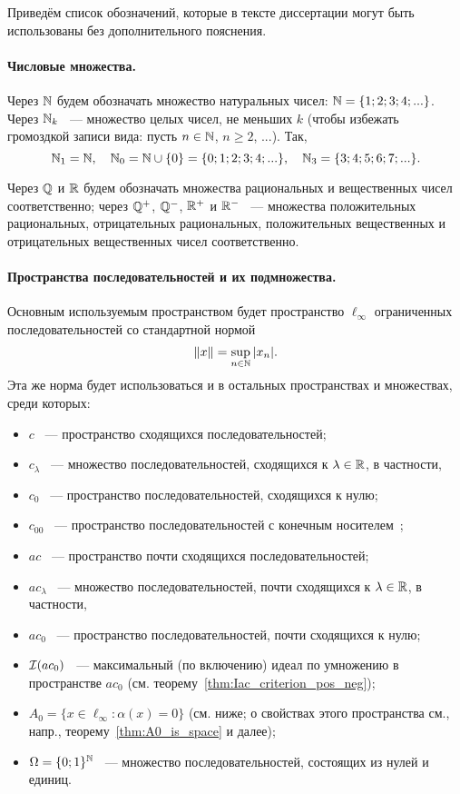 Приведём список обозначений, которые в тексте диссертации могут быть использованы без дополнительного пояснения.


\paragraph{Числовые множества.}
Через $\mathbb{N}$ будем обозначать множество натуральных чисел: $\mathbb{N} = \{1;2;3;4;...\}$.
Через $\mathbb{N}_k$ ~--- множество целых чисел, не меньших $k$ (чтобы избежать громоздкой записи вида: пусть $n\in \mathbb{N}$, $n \geq 2$, ...).
Так,
\begin{equation}
	\mathbb{N}_1 = \mathbb{N}
	,
	\quad
	\mathbb{N}_0 = \mathbb{N} \cup\{0\} = \{0;1;2;3;4;...\}
	,
	\quad
	\mathbb{N}_3 = \{3;4;5;6;7;...\}
	.
\end{equation}

Через $\mathbb{Q}$ и $\mathbb{R}$ будем обозначать множества рациональных и вещественных чисел соответственно;
через $\mathbb{Q}^+$, $\mathbb{Q}^-$, $\mathbb{R}^+$ и $\mathbb{R}^-$ ~--- множества положительных рациональных, отрицательных рациональных,
положительных вещественных и отрицательных вещественных чисел соответственно.

\paragraph{Пространства последовательностей и их подмножества.}

Основным используемым пространством будет пространство $\ell_\infty$ ограниченных последовательностей со стандартной нормой
\begin{equation}
	\|x\| = \sup_{n\in\mathbb{N}} |x_n|
	.
\end{equation}
Эта же норма будет использоваться и в остальных пространствах и множествах, среди которых:
\begin{itemize}
	\item
		$c$ ~--- пространство сходящихся последовательностей;
	\item
		$c_\lambda$ ~--- множество последовательностей, сходящихся к $\lambda \in \mathbb{R}$, в частности,
	\item
		$c_0$ ~--- пространство последовательностей, сходящихся к нулю;
	\item
		$c_{00}$ ~--- пространство последовательностей с конечным носителем~\cite[теорема 4]{ASSU2};
	\item
		$ac$ ~--- пространство почти сходящихся последовательностей;
	\item
		$ac_\lambda$ ~--- множество последовательностей, почти сходящихся к $\lambda \in \mathbb{R}$, в частности,
	\item
		$ac_0$ ~--- пространство последовательностей, почти сходящихся к нулю;
	\item
		$\mathcal{I}(ac_0)$ ~--- максимальный (по включению) идеал по умножению в пространстве $ac_0$ (см. теорему~\ref{thm:Iac_criterion_pos_neg});
	\item
		$A_0 = \{ x\in\ell_\infty : \alpha(x) = 0\}$ (см. ниже; о свойствах этого пространства см., напр., теорему~\ref{thm:A0_is_space} и далее);
	\item
		$\Omega = \{0;1\}^{\mathbb{N}}$ ~--- множество последовательностей, состоящих из нулей и единиц.
\end{itemize}



